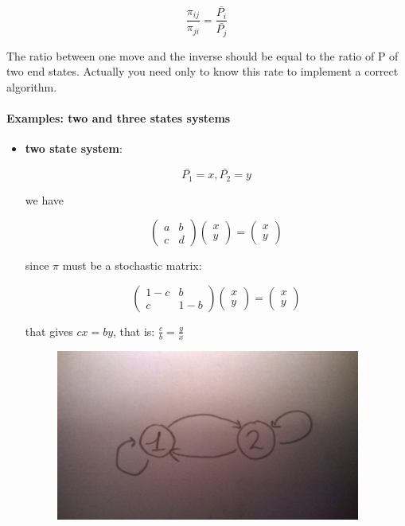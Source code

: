 \documentclass[a4paper, italian, openany]{book}
\begin{document}
$$\frac{\pi_{ij}}{\pi_{ji}} = \frac{\bar{P_i}}{\bar{P_j}}$$

The ratio between one move and the inverse should be equal to the ratio of P of two end states. Actually you need only to know this rate to implement a correct algorithm.

\paragraph{Examples: two and three states systems}

\begin{itemize}
\item \textbf{two state system}:

$$\bar{P_1} = x, \bar{P_2} = y$$

we have

$$\left ( \begin{array}{cc} a & b \\ c & d \end{array} \right ) \left ( \begin{array}{c} x\\ y \end{array} \right ) = \left ( \begin{array}{c} x\\ y \end{array} \right )$$

since $\pi$ must be a stochastic matrix:

$$\left ( \begin{array}{cc} 1-c & b \\ c & 1-b \end{array} \right ) \left ( \begin{array}{c} x\\ y \end{array} \right ) = \left ( \begin{array}{c} x\\ y \end{array} \right )$$

that gives $cx = by$, that is: $\frac{c}{b}=\frac{y}{x}$

\begin{figure}[H]
\centering
\includegraphics[width=100mm]{img/pic13.jpg}
\end{figure}


\end{itemize}
\end{document}
